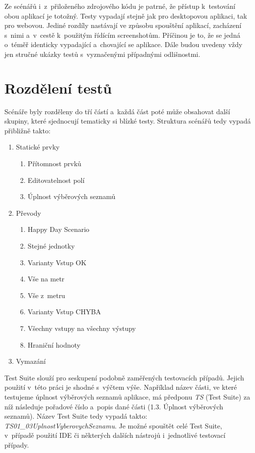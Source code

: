 Ze scénářů i~z~přiloženého zdrojového kódu je patrné, že přístup k~testování obou aplikací je totožný. Testy vypadají stejně jak pro desktopovou aplikaci, tak pro webovou. Jediné rozdíly nastávají ve způsobu spouštění aplikací, zacházení s~nimi a~v~cestě k~použitým řídícím screenshotům. Příčinou je to, že se jedná o~téměř identicky vypadající a~chovající se aplikace. Dále budou uvedeny vždy jen stručné ukázky testů s~vyznačenými případnými odlišnostmi.

	\section{Rozdělení testů}
	Scénáře byly rozděleny do tří částí a~každá část poté může obsahovat další skupiny, které sjednocují tematicky si blízké testy. Struktura scénářů tedy vypadá přibližně takto:
		{\renewcommand{\labelenumii}{\theenumii}
		\renewcommand{\theenumii}{\theenumi.\arabic{enumii}.}
		\begin{enumerate}
		\item Statické prvky
			\begin{enumerate}
			\item Přítomnost prvků
			\item Editovatelnost polí
			\item Úplnost výběrových seznamů
			\end{enumerate}
		\item Převody
			\begin{enumerate}
			\item Happy Day Scenario
			\item Stejné jednotky
			\item Varianty Vstup OK
			\item Vše na metr
			\item Vše z~metru
			\item Varianty Vstup CHYBA
			\item Všechny vstupy na všechny výstupy
			\item Hraniční hodnoty
			\end{enumerate}
		\item Vymazání
		\end{enumerate}}
	
	Test Suite slouží pro seskupení podobně zaměřených testovacích případů. Jejich použití v~této práci je shodné s~výčtem výše. Například název části, ve které testujeme úplnost výběrových seznamů aplikace, má předponu \emph{TS} (Test Suite) za níž následuje pořadové číslo a~popis dané části (1.3. Úplnost výběrových seznamů). Název Test Suite tedy vypadá takto: \emph{TS01\_03UplnostVyberovychSeznamu}. Je možné spouštět celé Test Suite, v~případě použití IDE či některých dalších nástrojů i~jednotlivé testovací případy.
		
